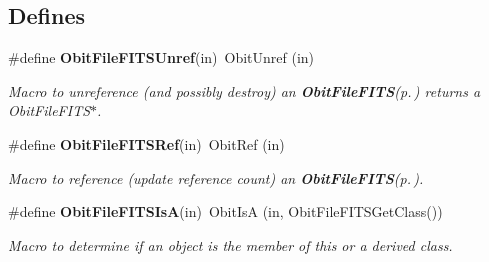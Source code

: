 \subsection*{Defines}
\begin{CompactItemize}
\item 
\#define {\bf Obit\-File\-FITSUnref}(in)\ Obit\-Unref (in)
\begin{CompactList}\small\item\em Macro to unreference (and possibly destroy) an {\bf Obit\-File\-FITS}{\rm (p.\,\pageref{structObitFileFITS})} returns a Obit\-File\-FITS$\ast$. \item\end{CompactList}\item 
\#define {\bf Obit\-File\-FITSRef}(in)\ Obit\-Ref (in)
\begin{CompactList}\small\item\em Macro to reference (update reference count) an {\bf Obit\-File\-FITS}{\rm (p.\,\pageref{structObitFileFITS})}. \item\end{CompactList}\item 
\#define {\bf Obit\-File\-FITSIs\-A}(in)\ Obit\-Is\-A (in, Obit\-File\-FITSGet\-Class())
\begin{CompactList}\small\item\em Macro to determine if an object is the member of this or a derived class. \item\end{CompactList}\end{CompactItemize}
